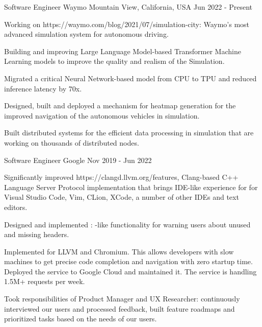 
\begin{cventries}

  \cventry
    {Software Engineer}
    {Waymo}
    {Mountain View, California, USA}
    {Jun 2022 - Present}
    {
      \begin{cvitems}
        \item Working on 
	{https://waymo.com/blog/2021/07/simulation-city}: Waymo's most
        advanced simulation system for autonomous driving.
        \item Building and improving Large Language Model-based Transformer
          Machine Learning models to improve the quality and realism of the
          Simulation.
        \item Migrated a critical Neural Network-based model from CPU to TPU and
          reduced inference latency by 70x.
        \item Designed, built and deployed a mechanism for heatmap generation
          for the improved navigation of the autonomous vehicles in simulation.
        \item Built distributed systems for the efficient data processing in
          simulation that are working on thousands of distributed nodes.
      \end{cvitems}
    }

  \cventry
    {Software Engineer}
    {Google}
    {}
    {Nov 2019 - Jun 2022}
    {
      \begin{cvitems}
        \item Significantly improved 
	  {https://clangd.llvm.org/features}, Clang-based C++ Language
	  Server Protocol implementation that brings IDE-like experience for
	  for Visual Studio Code, Vim, CLion, XCode, a number of
	  other IDEs and text editors.
        \item Designed and implemented :
	  -like functionality
          for warning users about unused and missing headers.
        \item Implemented  for LLVM and Chromium. This
          allows developers with slow machines to get precise code completion
          and navigation with zero startup time. Deployed the service to Google
	  Cloud and maintained it. The service is handling 1.5M+ requests
          per week.
        \item Took responsibilities of Product Manager and UX Researcher:
          continuously interviewed our users and processed feedback, built
          feature roadmaps and prioritized tasks based on the needs of our
          users.
      \end{cvitems}
    }


\end{cventries}
